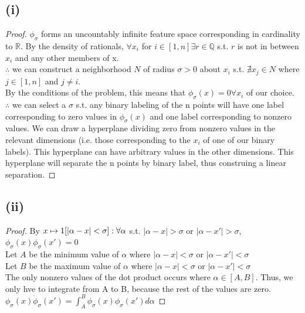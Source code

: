 \documentclass[twoside,11pt]{homework}
\begin{document}
\subsection*{(i)}
	\begin{proof}
		$\phi_\sigma$ forms an uncountably infinite feature space corresponding in cardinality to $\mathbb{R}$. 
		By the density of rationals, $\forall x_i$ for $i \in [1,n] \exists r \in \mathbb{Q}$  
		s.t. $r$ is not in between $x_i$ and any other members of x. \\
		$\therefore$ we can construct a neighborhood $N$ of radius $\sigma > 0$ about $x_i$ 
		s.t. $\nexists x_j \in N$ where $j \in [1, n]$ and $j \neq i$. \\
		By the conditions of the problem, this means that $\phi_\sigma (x) = 0 \forall x_i$ of our choice. \\
		$\therefore$ we can select a $\sigma$ s.t. any binary labeling of the n points will have one label corresponding to zero values in $\phi_\sigma(x)$ and one label corresponding to nonzero values. We can draw a hyperplane dividing zero from nonzero values in the relevant dimensions (i.e. those corresponding to the $x_i$ of one of our binary labels). This hyperplane can have arbitrary values in the other dimensions. This hyperplane will separate the n points by binary label, thus construing a linear separation. 
	\end{proof}

\subsection*{(ii)}
	\begin{proof}
		By $x \mapsto 1[|\alpha-x| < \sigma]:\\
		\forall \alpha$ s.t. $|\alpha - x| > \sigma $ or $|\alpha - x'| > \sigma$, $\phi_\sigma(x) \phi_\sigma(x') = 0$\\
		Let $A$ be the minimum value of $\alpha$ where $|\alpha - x| < \sigma $ or $|\alpha - x'| < \sigma$\\
		Let $B$ be the maximum value of $\alpha$ where $|\alpha - x| < \sigma $ or $|\alpha - x'| < \sigma$\\
		The only nonzero values of the dot product occurs where $\alpha \in [A, B]$.  Thus, we only hve to integrate from A to B, because the rest of the values are zero.\\
		$\phi_\sigma(x) \dot \phi_\sigma(x') = \int_{A}^{B} \phi_\sigma(x) \phi_\sigma(x') d\alpha$
	\end{proof}
\end{document}
